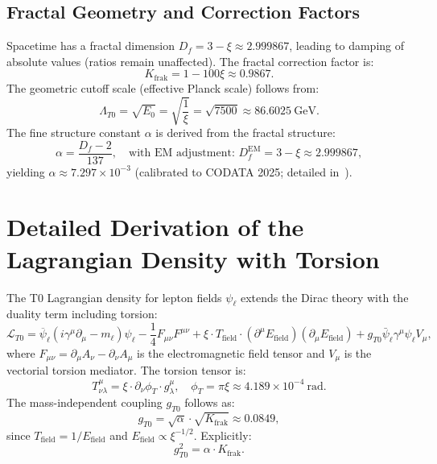 \documentclass[12pt,a4paper]{article}
\theoremstyle{definition}
\begin{document}
	\subsection{Fractal Geometry and Correction Factors}
	Spacetime has a fractal dimension $D_f = 3 - \xi \approx 2.999867$, leading to damping of absolute values (ratios remain unaffected). The fractal correction factor is:
	\begin{equation}
		K_{\text{frak}} = 1 - 100 \xi \approx 0.9867.
	\end{equation}
	The geometric cutoff scale (effective Planck scale) follows from:
	\begin{equation}
		\Lambda_{T0} = \sqrt{E_0} = \sqrt{\frac{1}{\xi}} = \sqrt{7500} \approx \SI{86.6025}{\giga\electronvolt}.
	\end{equation}
	The fine structure constant $\alpha$ is derived from the fractal structure:
	\begin{equation}
		\alpha = \frac{D_f - 2}{137}, \quad \text{with EM adjustment: } D_f^\text{EM} = 3 - \xi \approx 2.999867,
	\end{equation}
	yielding $\alpha \approx 7.297 \times 10^{-3}$ (calibrated to CODATA 2025; detailed in~\cite{T0_fine_structure}).
	
	\section{Detailed Derivation of the Lagrangian Density with Torsion}
	The T0 Lagrangian density for lepton fields $\psi_\ell$ extends the Dirac theory with the duality term including torsion:
	\begin{equation}
		\mathcal{L}_{T0} = \overline{\psi}_\ell (i \gamma^\mu \partial_\mu - m_\ell) \psi_\ell - \frac{1}{4} F_{\mu\nu} F^{\mu\nu} + \xi \cdot T_{\text{field}} \cdot (\partial^\mu E_{\text{field}}) (\partial_\mu E_{\text{field}}) + g_{T0} \bar{\psi}_\ell \gamma^\mu \psi_\ell V_\mu,
	\end{equation}
	where $F_{\mu\nu} = \partial_\mu A_\nu - \partial_\nu A_\mu$ is the electromagnetic field tensor and $V_\mu$ is the vectorial torsion mediator. The torsion tensor is:
	\begin{equation}
		T^\mu_{\nu\lambda} = \xi \cdot \partial_\nu \phi_T \cdot g_{\lambda}^\mu, \quad \phi_T = \pi \xi \approx 4.189 \times 10^{-4}\ \text{rad}.
	\end{equation}
	The mass-independent coupling $g_{T0}$ follows as:
	\begin{equation}
		g_{T0} = \sqrt{\alpha} \cdot \sqrt{K_{\text{frak}}} \approx 0.0849,
	\end{equation}
	since $T_{\text{field}} = 1 / E_{\text{field}}$ and $E_{\text{field}} \propto \xi^{-1/2}$. Explicitly:
	\begin{equation}
		g_{T0}^2 = \alpha \cdot K_{\text{frak}}.
	\end{equation}
	
\end{document}
